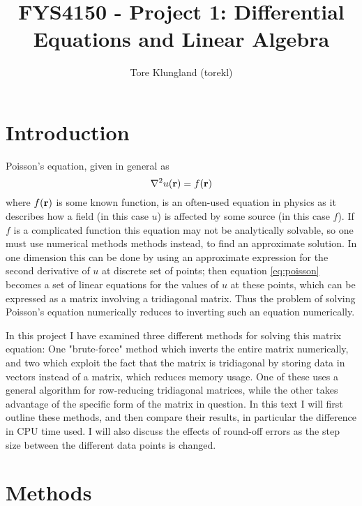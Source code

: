 \documentclass[a4paper,english]{article}
\title{FYS4150 - Project 1: Differential Equations and Linear Algebra}
\author{Tore Klungland (torekl)}
\renewcommand\vec{\mathbf}
\let\originalleft\left
\let\originalright\right
\renewcommand{\left}{\mathopen{}\mathclose\bgroup\originalleft}
\renewcommand{\right}{\aftergroup\egroup\originalright}
\begin{document}
\maketitle
\section{Introduction}
Poisson's equation, given in general as
\begin{equation}
  \nabla^2 u\left(\vec{r}\right) = f\left(\vec{r}\right)
  \label{eq:poisson}
\end{equation}
where $f\left(\vec{r}\right)$ is some known function, is an often-used equation in physics as it describes how a field (in this case $u$) is affected by some source (in this case $f$). If $f$ is a complicated function this equation may not be analytically solvable, so one must use numerical methods methods instead, to find an approximate solution. In one dimension this can be done by using an approximate expression for the second derivative of $u$ at discrete set of points; then equation \ref{eq:poisson} becomes a set of linear equations for the values of $u$ at these points, which can be expressed as a matrix involving a tridiagonal matrix. Thus the problem of solving Poisson's equation numerically reduces to inverting such an equation numerically. \par
In this project I have examined three different methods for solving this matrix equation: One "brute-force" method which inverts the entire matrix numerically, and two which exploit the fact that the matrix is tridiagonal by storing data in vectors instead of a matrix, which reduces memory usage. One of these uses a general algorithm for row-reducing tridiagonal matrices, while the other takes advantage of the specific form of the matrix in question. In this text I will first outline these methods, and then compare their results, in particular the difference in CPU time used. I will also discuss the effects of round-off errors as the step size between the different data points is changed.
\section{Methods}
\end{document}
